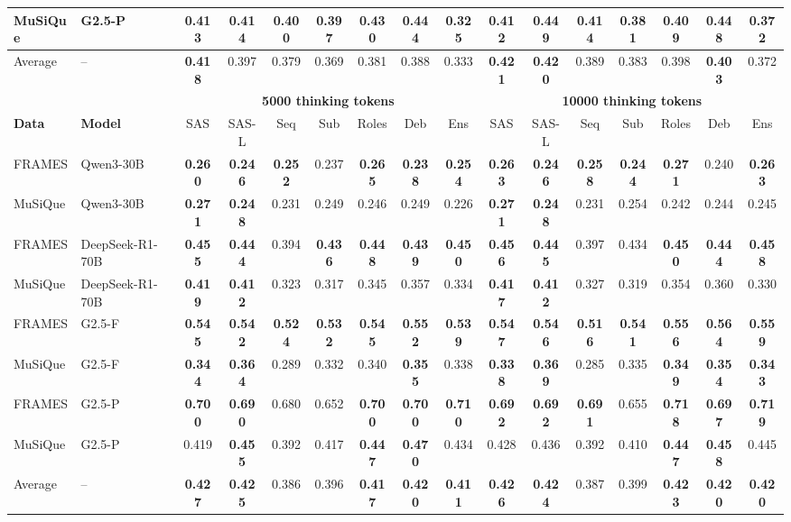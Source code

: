 \documentclass{article} %
\begin{document}
\begin{table}[t]
{\begin{tabular}{ll|ccccccc|ccccccc}
MuSiQue & G2.5-P
& 0.413 & 0.414 & 0.400 & 0.397 & \textbf{0.430} & \textbf{0.444} & 0.325
& 0.412 & \textbf{0.449} & 0.414 & 0.381 & 0.409 & \textbf{0.448} & 0.372 \\
\midrule
Average & --
& \textbf{0.418} & 0.397 & 0.379 & 0.369 & 0.381 & 0.388 & 0.333
& \textbf{0.421} & \textbf{0.420} & 0.389 & 0.383 & 0.398 & \textbf{0.403} & 0.372 \\
\midrule
& & \multicolumn{7}{c|}{\textbf{5000 thinking tokens}} & \multicolumn{7}{c}{\textbf{10000 thinking tokens}} \\
\cmidrule(lr){3-9}\cmidrule(lr){10-16}
\textbf{Data} & \textbf{Model} &
SAS & SAS-L & Seq & Sub & Roles & Deb & Ens &
SAS & SAS-L & Seq & Sub & Roles & Deb & Ens \\
\midrule
FRAMES & Qwen3-30B
& \textbf{0.260} & \textbf{0.246} & \textbf{0.252} & 0.237 & \textbf{0.265} & \textbf{0.238} & \textbf{0.254}
& \textbf{0.263} & \textbf{0.246} & \textbf{0.258} & \textbf{0.244} & \textbf{0.271} & 0.240 & \textbf{0.263} \\
MuSiQue & Qwen3-30B
& \textbf{0.271} & \textbf{0.248} & 0.231 & 0.249 & 0.246 & 0.249 & 0.226
& \textbf{0.271} & \textbf{0.248} & 0.231 & 0.254 & 0.242 & 0.244 & 0.245 \\
\midrule
FRAMES & DeepSeek-R1-70B
& \textbf{0.455} & \textbf{0.444} & 0.394 & \textbf{0.436} & \textbf{0.448} & \textbf{0.439} & \textbf{0.450}
& \textbf{0.456} & \textbf{0.445} & 0.397 & 0.434 & \textbf{0.450} & \textbf{0.444} & \textbf{0.458} \\
MuSiQue & DeepSeek-R1-70B
& \textbf{0.419} & \textbf{0.412} & 0.323 & 0.317 & 0.345 & 0.357 & 0.334
& \textbf{0.417} & \textbf{0.412} & 0.327 & 0.319 & 0.354 & 0.360 & 0.330 \\
\midrule
FRAMES & G2.5-F
& \textbf{0.545} & \textbf{0.542} & \textbf{0.524} & \textbf{0.532} & \textbf{0.545} & \textbf{0.552} & \textbf{0.539}
& \textbf{0.547} & \textbf{0.546} & \textbf{0.516} & \textbf{0.541} & \textbf{0.556} & \textbf{0.564} & \textbf{0.559} \\
MuSiQue & G2.5-F
& \textbf{0.344} & \textbf{0.364} & 0.289 & 0.332 & 0.340 & \textbf{0.355} & 0.338
& \textbf{0.338} & \textbf{0.369} & 0.285 & 0.335 & \textbf{0.349} & \textbf{0.354} & \textbf{0.343} \\
\midrule
FRAMES & G2.5-P
& \textbf{0.700} & \textbf{0.690} & 0.680 & 0.652 & \textbf{0.700} & \textbf{0.700} & \textbf{0.710}
& \textbf{0.692} & \textbf{0.692} & \textbf{0.691} & 0.655 & \textbf{0.718} & \textbf{0.697} & \textbf{0.719} \\
MuSiQue & G2.5-P
& 0.419 & \textbf{0.455} & 0.392 & 0.417 & \textbf{0.447} & \textbf{0.470} & 0.434
& 0.428 & 0.436 & 0.392 & 0.410 & \textbf{0.447} & \textbf{0.458} & 0.445 \\
\midrule
Average & --
& \textbf{0.427} & \textbf{0.425} & 0.386 & 0.396 & \textbf{0.417} & \textbf{0.420} & \textbf{0.411}
& \textbf{0.426} & \textbf{0.424} & 0.387 & 0.399 & \textbf{0.423} & \textbf{0.420} & \textbf{0.420} \\
\bottomrule
\end{tabular}
}
\end{table}
\end{document}
